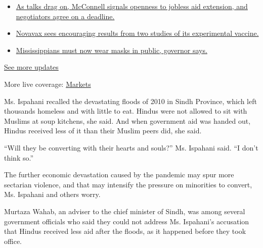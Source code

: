 \begin{itemize}
\tightlist
\item
  \href{https://www.nytimes3xbfgragh.onion/2020/08/04/world/coronavirus-cases.html?action=click\&pgtype=Article\&state=default\&region=MAIN_CONTENT_1\&context=storylines_live_updates\#link-762df92}{As
  talks drag on, McConnell signals openness to jobless aid extension,
  and negotiators agree on a deadline.}
\item
  \href{https://www.nytimes3xbfgragh.onion/2020/08/04/world/coronavirus-cases.html?action=click\&pgtype=Article\&state=default\&region=MAIN_CONTENT_1\&context=storylines_live_updates\#link-1228a480}{Novavax
  sees encouraging results from two studies of its experimental
  vaccine.}
\item
  \href{https://www.nytimes3xbfgragh.onion/2020/08/04/world/coronavirus-cases.html?action=click\&pgtype=Article\&state=default\&region=MAIN_CONTENT_1\&context=storylines_live_updates\#link-794484ed}{Mississippians
  must now wear masks in public, governor says.}
\end{itemize}

\href{https://www.nytimes3xbfgragh.onion/2020/08/04/world/coronavirus-cases.html?action=click\&pgtype=Article\&state=default\&region=MAIN_CONTENT_1\&context=storylines_live_updates}{See
more updates}

More live coverage:
\href{https://www.nytimes3xbfgragh.onion/live/2020/08/04/business/stock-market-today-coronavirus?action=click\&pgtype=Article\&state=default\&region=MAIN_CONTENT_1\&context=storylines_live_updates}{Markets}

Ms. Ispahani recalled the devastating floods of 2010 in Sindh Province,
which left thousands homeless and with little to eat. Hindus were not
allowed to sit with Muslims at soup kitchens, she said. And when
government aid was handed out, Hindus received less of it than their
Muslim peers did, she said.

``Will they be converting with their hearts and souls?'' Ms. Ispahani
said. ``I don't think so.''

The further economic devastation caused by the pandemic may spur more
sectarian violence, and that may intensify the pressure on minorities to
convert, Ms. Ispahani and others worry.

Murtaza Wahab, an adviser to the chief minister of Sindh, was among
several government officials who said they could not address Ms.
Ispahani's accusation that Hindus received less aid after the floods, as
it happened before they took office.


